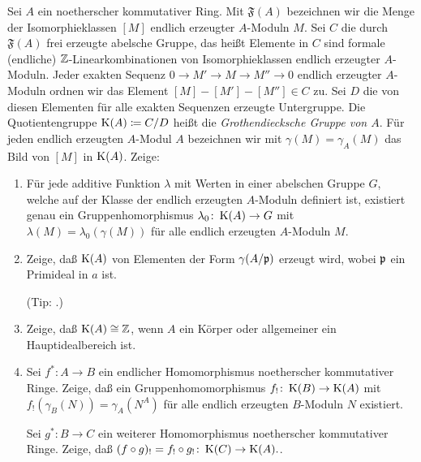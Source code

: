 \begin{exercise}
	\label{exer:groth_group}
	Sei \(A\) ein noetherscher kommutativer Ring. Mit \(\mathfrak F(A)\)
	bezeichnen wir die Menge der Isomorphieklassen \([M]\) endlich erzeugter
	\(A\)-Moduln \(M\). Sei \(C\) die durch \(\mathfrak F(A)\) frei erzeugte
	abelsche Gruppe, das heißt Elemente in \(C\) sind formale (endliche)
	\(\mathbb Z\)-Linearkombinationen von Isomorphieklassen endlich erzeugter
	\(A\)-Moduln. Jeder exakten Sequenz \(0 \to M' \to M \to M'' \to 0\)
	endlich erzeugter \(A\)-Moduln ordnen wir das Element
	\([M] - [M'] - [M''] \in C\) zu. Sei \(D\) die von diesen Elementen für alle
	exakten Sequenzen erzeugte Untergruppe. Die Quotientengruppe
	\(\operatorname{K}(A) \coloneqq C/D\) heißt die \emph{Grothendiecksche Gruppe
	von \(A\)}. Für jeden endlich erzeugten \(A\)-Modul \(A\) bezeichnen wir mit
	\(\gamma(M) = \gamma_A(M)\) das Bild von \([M]\) in \(\operatorname{K}(A)\).
	Zeige:
	\begin{enumerate}
	\item
		Für jede additive Funktion \(\lambda\) mit Werten in einer abelschen
		Gruppe \(G\), welche auf der Klasse der endlich erzeugten \(A\)-Moduln
		definiert ist, existiert genau ein Gruppenhomorphismus
		\(\lambda_0\colon \operatorname{K}(A) \to G\) mit \(\lambda(M) = 
		\lambda_0(\gamma(M))\) für alle endlich erzeugten \(A\)-Moduln \(M\).
	\item
		Zeige, daß \(\operatorname{K}(A)\) von Elementen der Form \(\gamma(A/\mathfrak{p})\)
		erzeugt wird, wobei \(\mathfrak{p}\) ein Primideal in \(a\) ist.
		
		(Tip: .)
	\item
		Zeige, daß \(\operatorname{K}(A) \cong \mathbb Z\), wenn \(A\) ein Körper oder
		allgemeiner ein Hauptidealbereich ist.
	\item
		Sei \(f^*\colon A \to B\) ein endlicher Homomorphismus
		noetherscher kommutativer Ringe. Zeige, daß ein Gruppenhomomorphismus
		\(f_!\colon \operatorname{K}(B) \to \operatorname{K}(A)\) mit \(f_!(\gamma_B(N))
		= \gamma_A(N^A)\) für alle endlich erzeugten \(B\)-Moduln
		\(N\) existiert.
	
		Sei \(g^*\colon B \to C\) ein weiterer Homomorphismus noetherscher
		kommutativer Ringe. Zeige, daß \((f \circ g)_! = f_! \circ g_!\colon
		\operatorname{K}(C) \to \operatorname{K}(A).\).
	\end{enumerate}
\end{exercise}

